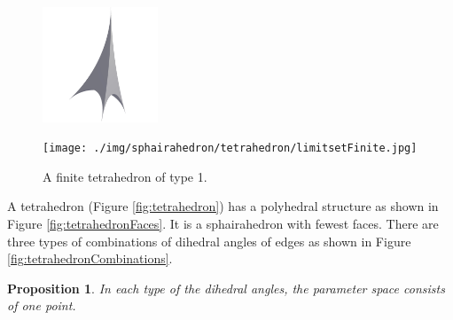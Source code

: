 \documentclass[suppldata, dvipdfmx]{interact}
\theoremstyle{plain}%
\newtheorem{proposition}[theorem]{Proposition}
\theoremstyle{definition}
\theoremstyle{remark}
\theoremstyle{problemstyle}
\begin{document}
\begin{figure}[H]
  \begin{minipage}[t]{0.49\textwidth}
   \centering
   \includegraphics[width=1.35in, height=1.35in, keepaspectratio]{./img/sphairahedron/tetrahedron/sphairahedronFinite.jpg}
   \label{fig:tetrahedronFiniteSphairahedron}
  \end{minipage}
  \hspace*{\fill}
  \begin{minipage}[t]{0.49\textwidth}
   \centering
   \texttt{[image: ./img/sphairahedron/tetrahedron/limitsetFinite.jpg]}
   \label{fig:tetrahedronFiniteLimitset}
  \end{minipage}
  \hspace*{\fill}
  \caption{A finite tetrahedron of type 1.}
  \label{fig:tetrahedronFinite}
\end{figure}

A tetrahedron (Figure \ref{fig:tetrahedron}) has a polyhedral structure as shown in Figure \ref{fig:tetrahedronFaces}.  It is a sphairahedron with fewest faces.
There are three types of combinations of dihedral angles of edges as shown in
Figure \ref{fig:tetrahedronCombinations}.

\begin{proposition}\label{prop:paraSpace_Tetrahedron}
In each type of the dihedral angles, the parameter space consists of one point.
\end{proposition}
\end{document}
